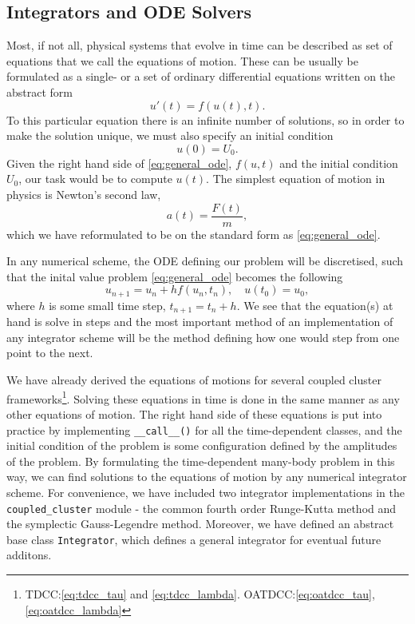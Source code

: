 \subsection{Integrators and ODE Solvers}

    Most, if not all, physical systems that evolve in time can be described 
    as set of equations that we call the equations of motion. These can be usually 
    be formulated as a single- or a set of ordinary differential equations written 
    on the abstract form
    \begin{equation}
        \label{eq:general_ode}
        u'(t) = f(u(t), t).
    \end{equation}
    To this particular equation there is an infinite number of solutions, so in order to
    make the solution unique, we must also specify an initial condition
    \begin{equation}
        u(0) = U_0.
    \end{equation}
    Given the right hand side of \autoref{eq:general_ode}, $f(u,t)$ and the initial
    condition $U_0$, our task would be to compute $u(t)$. The simplest equation of motion
    in physics is Newton's second law,
    \begin{equation}
        a(t) = \frac{F(t)}{m},
    \end{equation}
    which we have reformulated to be on the standard form as \autoref{eq:general_ode}.
 
    In any numerical scheme, the ODE defining our problem will be discretised, such 
    that the inital value problem \autoref{eq:general_ode} becomes the following 
    \begin{equation}
        u_{n+1} = u_n + hf(u_n, t_n), \quad u(t_0) = u_0,
    \end{equation}
    where $h$ is some small time step, $t_{n+1} = t_n + h$. We see that the equation(s) at 
    hand is solve in steps and the most important method of an implementation of any integrator 
    scheme will be the method defining how one would step from one point to the next. 
 
    We have already derived the equations of motions for several coupled 
    cluster frameworks\footnote{TDCC:\autoref{eq:tdcc_tau} and
    \autoref{eq:tdcc_lambda}.
    OATDCC:\autoref{eq:oatdcc_tau}, \autoref{eq:oatdcc_lambda}}. Solving these equations 
    in time is done in the same manner as any other equations of motion. The right hand 
    side of these equations is put into practice by implementing \lstinline{__call__()} for 
    all the time-dependent classes, and the initial condition of the problem is some 
    configuration defined by the amplitudes of the problem. By formulating the time-dependent
    many-body problem in this way, we can find solutions to the equations of motion by 
    any numerical integrator scheme. For convenience, we have included two integrator 
    implementations in the \lstinline{coupled_cluster} module - the common fourth order 
    Runge-Kutta method and the symplectic Gauss-Legendre method. Moreover, we have defined an 
    abstract base class \lstinline{Integrator}, which defines a general integrator for 
    eventual future additons.

